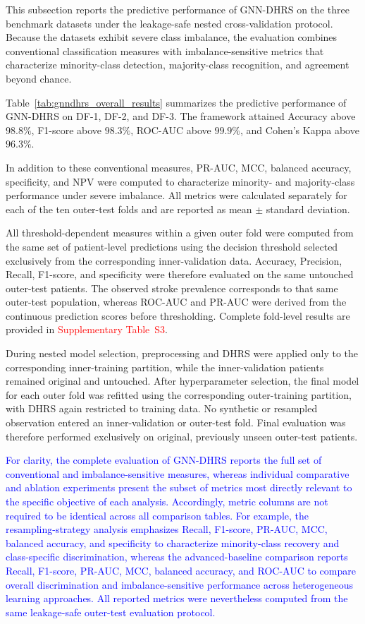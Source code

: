\documentclass[pdflatex,sn-mathphys-num]{sn-jnl}%
\theoremstyle{thmstyleone}%
\theoremstyle{thmstyletwo}%
\theoremstyle{thmstylethree}%
\begin{document}
This subsection reports the predictive performance of GNN-DHRS on the three
benchmark datasets under the leakage-safe nested cross-validation protocol.
Because the datasets exhibit severe class imbalance, the evaluation combines
conventional classification measures with imbalance-sensitive metrics that
characterize minority-class detection, majority-class recognition, and
agreement beyond chance.

Table~\ref{tab:gnndhrs_overall_results} summarizes the predictive performance
of GNN-DHRS on DF-1, DF-2, and DF-3. The framework attained Accuracy above
\(98.8\%\), F1-score above \(98.3\%\), ROC-AUC above \(99.9\%\), and Cohen's
Kappa above \(96.3\%\).

 {
In addition to these conventional measures, PR-AUC, MCC, balanced accuracy,
specificity, and NPV were computed to characterize minority- and
majority-class performance under severe imbalance. All metrics were calculated
separately for each of the ten outer-test folds and are reported as mean
\(\pm\) standard deviation.
}

 {
All threshold-dependent measures within a given outer fold were computed from
the same set of patient-level predictions using the decision threshold selected
exclusively from the corresponding inner-validation data. Accuracy, Precision,
Recall, F1-score, and specificity were therefore evaluated on the same
untouched outer-test patients. The observed stroke prevalence corresponds to
that same outer-test population, whereas ROC-AUC and PR-AUC were derived from
the continuous prediction scores before thresholding. Complete fold-level
results are provided in \textcolor{red}{Supplementary Table~S3}.
}

 {
During nested model selection, preprocessing and DHRS were applied only to the
corresponding inner-training partition, while the inner-validation patients
remained original and untouched. After hyperparameter selection, the final
model for each outer fold was refitted using the corresponding outer-training
partition, with DHRS again restricted to training data. No synthetic or
resampled observation entered an inner-validation or outer-test fold. Final
evaluation was therefore performed exclusively on original, previously unseen
outer-test patients.
}

\textcolor{blue}{
For clarity, the complete evaluation of GNN-DHRS reports the full set of
conventional and imbalance-sensitive measures, whereas individual comparative
and ablation experiments present the subset of metrics most directly relevant
to the specific objective of each analysis. Accordingly, metric columns are
not required to be identical across all comparison tables. For example, the
resampling-strategy analysis emphasizes Recall, F1-score, PR-AUC, MCC,
balanced accuracy, and specificity to characterize minority-class recovery
and class-specific discrimination, whereas the advanced-baseline comparison
reports Recall, F1-score, PR-AUC, MCC, balanced accuracy, and ROC-AUC to
compare overall discrimination and imbalance-sensitive performance across
heterogeneous learning approaches. All reported metrics were nevertheless
computed from the same leakage-safe outer-test evaluation protocol.
}
\end{document}

